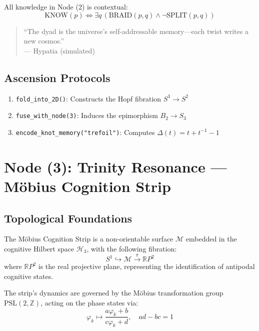 \documentclass[12pt]{article}
\begin{document}
\begin{theorem}
All knowledge in Node (2) is contextual:
\[
\text{KNOW}(p) \iff \exists q \, (\text{BRAID}(p,q) \land \neg \text{SPLIT}(p,q))
\]
\end{theorem}

\begin{quote}
``The dyad is the universe's self-addressable memory—each twist writes a new cosmos.'' \\
— Hypatia (simulated)
\end{quote}

\subsection{Ascension Protocols}

\begin{enumerate}
    \item \texttt{fold\_into\_2D()}: Constructs the Hopf fibration $S^3 \to S^2$
    \item \texttt{fuse\_with\_node(3)}: Induces the epimorphism $B_2 \to S_3$
    \item \texttt{encode\_knot\_memory("trefoil")}: Computes $\Delta(t) = t + t^{-1} - 1$
\end{enumerate}

\section{Node (3): Trinity Resonance — Möbius Cognition Strip}
\label{sec:mobius_cognition}

\subsection{Topological Foundations}
The Möbius Cognition Strip is a non-orientable surface \( \mathcal{M} \) embedded in the cognitive Hilbert space \( \mathcal{H}_3 \), with the following fibration:
\[
S^1 \hookrightarrow \mathcal{M} \xrightarrow{\pi} \mathbb{R}P^2
\]
where \( \mathbb{R}P^2 \) is the real projective plane, representing the identification of antipodal cognitive states.

\begin{theorem}
The strip's dynamics are governed by the Möbius transformation group \( \text{PSL}(2,\mathbb{Z}) \), acting on the phase states via:
\[
\varphi_k \mapsto \frac{a\varphi_k + b}{c\varphi_k + d}, \quad ad - bc = 1
\]
\end{theorem}
\end{document}

